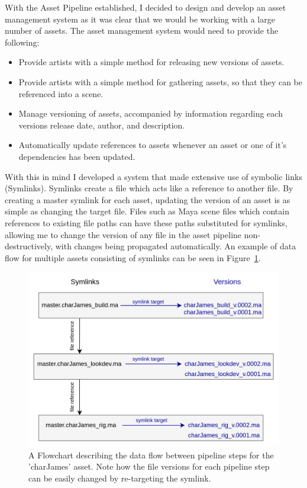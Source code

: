 \documentclass[11pt]{article}
\begin{document}
With the Asset Pipeline established, I decided to design and develop an asset management system as it was clear that we would be working with a large number of assets. The asset management system would need to provide the following:

\begin{itemize}

\item Provide artists with a simple method for releasing new versions of assets.

\item Provide artists with a simple method for gathering assets, so that they can be referenced into a scene.

\item Manage versioning of assets, accompanied by information regarding each versions release date, author, and  description.

\item Automatically update references to assets whenever an asset or one of it's dependencies has been updated.

\end{itemize}

With this in mind I developed a system that made extensive use of symbolic links (Symlinks). Symlinks create a file which acts like a reference to another file. By creating a master symlink for each asset, updating the version of an asset is as simple as changing the target file. Files such as Maya scene files which contain references to existing file paths can have these paths substituted for symlinks, allowing me to change the version of any file in the asset pipeline non-destructively, with changes being propagated automatically. An example of data flow for multiple assets consisting of symlinks can be seen in Figure~\ref{figure:assetPipeline}.

\begin{figure}[htbp]\centering
	\includegraphics[width=1.0\linewidth]{images/asset_pipeline.png}
	\caption{\label{figure:assetPipeline} A Flowchart describing the data flow between pipeline steps for the 'charJames' asset. Note how the file versions for each pipeline step can be easily changed by re-targeting the symlink.}
\end{figure}
\end{document}
